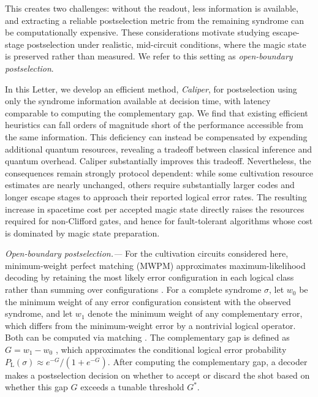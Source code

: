 \documentclass[
    reprint,
    amsmath,amssymb,
    nofootinbib,
    superscriptaddress,
    aps,
    noeprint,
    longbibliography,
    prl
]{revtex4-2}
\theoremstyle{plain}
\begin{document}
This creates two challenges: without the readout, less information is available, and extracting a
reliable postselection metric from the remaining syndrome can be computationally expensive. These
considerations motivate studying escape-stage postselection under realistic, mid-circuit conditions,
where the magic state is preserved rather than measured. We refer to this setting as
\emph{open-boundary postselection}.

In this Letter, we develop an efficient method, \emph{Caliper}, for postselection
using only the syndrome information available at decision time, with latency comparable to computing
the complementary gap. We find that existing efficient heuristics
\cite{lee_efficient_2026, staples_scalable_2026, birchall_macromux_2026} can fall orders of magnitude
short of the performance accessible from the same information. This deficiency can instead be
compensated by expending additional quantum resources, revealing a tradeoff between classical
inference and quantum overhead. Caliper substantially improves this tradeoff. Nevertheless, the
consequences remain strongly protocol dependent: while some cultivation resource estimates are
nearly unchanged, others require substantially larger codes and longer escape stages to approach
their reported logical error rates. The resulting increase in spacetime cost per accepted magic
state directly raises the resources required for non-Clifford gates, and hence for fault-tolerant algorithms whose
cost is dominated by magic state preparation.

\textit{Open-boundary postselection.---} For the cultivation circuits considered here,
minimum-weight perfect matching (MWPM) approximates maximum-likelihood decoding by retaining the
most likely error configuration in each logical class rather than summing over configurations
\cite{dennis_topological_2002, higgott_pymatching_2022, higgott_sparse_2025}. For a complete syndrome $\sigma$, let $w_0$ be the minimum weight of any error configuration consistent with the observed syndrome, and let $w_1$ denote the minimum weight of any complementary error, which differs from the minimum-weight error by a nontrivial logical operator. Both can be computed via matching \cite{hutter_efficient_2014}. The
complementary gap is defined as $G=w_1-w_0$ \cite{gidney_yoked_2023, bombin_fault-tolerant_2024}, which approximates
the conditional logical error probability $P_{\mathrm L}(\sigma)\approx e^{-G}/(1+e^{-G})$. After computing the complementary gap, a decoder makes a postselection decision on whether to accept or discard the shot based on whether this gap $G$ exceeds a tunable threshold $G^*$.
\end{document}

